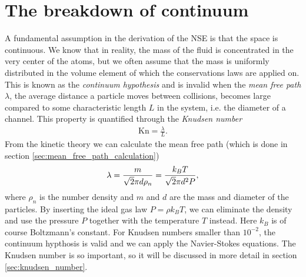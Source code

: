 \section{The breakdown of continuum}
\label{sec:continuum_breakdown}
A fundamental assumption in the derivation of the NSE is that the space is continuous. We know that in reality, the mass of the fluid is concentrated in the very center of the atoms, but we often assume that the mass is uniformly distributed in the volume element of which the conservations laws are applied on. This is known as the \textit{continuum hypothesis} and is invalid when the \textit{mean free path} $\lambda$, the average distance a particle moves between collisions, becomes large compared to some characteristic length $L$ in the system, i.e. the diameter of a channel\cite{karniadakis2005microflows}. This property is quantified through the \textit{Knudsen number}
\begin{align}
	\text{Kn} = \frac{\lambda}{L}.
\end{align}
From the kinetic theory we can calculate the mean free path (which is done in section \ref{sec:mean_free_path_calculation})
\begin{align}
	\lambda = {m\over \sqrt 2 \pi d \rho_n} = {k_B T\over \sqrt 2 \pi d^2 P},
\end{align}
where $\rho_n$ is the number density and $m$ and $d$ are the mass and diameter of the particles. By inserting the ideal gas law $P = \rho k_BT$, we can eliminate the density and use the pressure $P$ together with the temperature $T$ instead. Here $k_B$ is of course Boltzmann's constant. For Knudsen numbers smaller than $10^{-2}$, the continuum hypthosis is valid and we can apply the Navier-Stokes equations\cite{karniadakis2005microflows}. The Knudsen number is so important, so it will be discussed in more detail in section \ref{sec:knudsen_number}.

